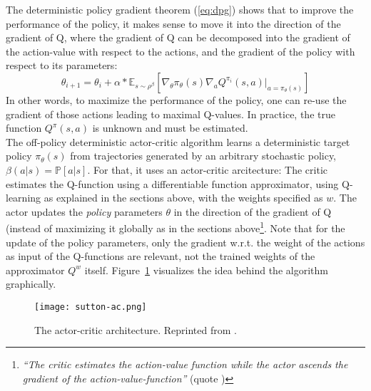 The deterministic policy gradient theorem (\ref{eq:dpg}) shows that to improve the performance of the policy, it makes sense to move it into the direction of the gradient of Q, where the gradient of Q can be decomposed into the gradient of the action-value with respect to the actions, and the gradient of the policy with respect to its parameters:
\begin{equation*}
	\theta_{i+1} = \theta_i + \alpha * \mathds{E}_{s \sim \rho^\beta} \left[ \nabla_\theta \pi_{\theta}(s) \nabla_a Q^{\pi_i}(s,a) \big|_{a=\pi_\theta(s)} \right]
\end{equation*} 
In other words, to maximize the performance of the policy, one can re-use the gradient of those actions leading to maximal Q-values. In practice, the true function $Q^\pi(s,a)$ is unknown and must be estimated.\\

\noindent The off-policy deterministic actor-critic algorithm learns a deterministic target policy $\pi_\theta(s)$ from trajectories generated by an arbitrary stochastic policy, $\beta(a|s) = \mathds{P}[a|s]$. For that, it uses an actor-critic arcitecture: The critic estimates the Q-function using a differentiable function approximator, using Q-learning as explained in the sections above, with the weights specified as $w$. The actor updates the \textit{policy} parameters $\theta$ in the direction of the gradient of Q (instead of maximizing it globally as in the sections above\footnote{\textit{``The critic estimates the action-value function while the actor ascends the gradient of the action-value-function''} (quote \cite{silver_deterministic_2014})}. Note that for the update of the policy parameters, only the gradient w.r.t. the weight of the actions as input of the Q-functions are relevant, not the trained weights of the approximator $Q^w$ itself. Figure~\ref{fig:actorcritic} visualizes the idea behind the algorithm graphically.
\begin{figure}[h]
	\texttt{[image: sutton-ac.png]}
	\centering
	\caption{The actor-critic architecture. Reprinted from \cite{richard_s._sutton_reinforcement_1998}.}
	\label{fig:actorcritic}
\end{figure}

